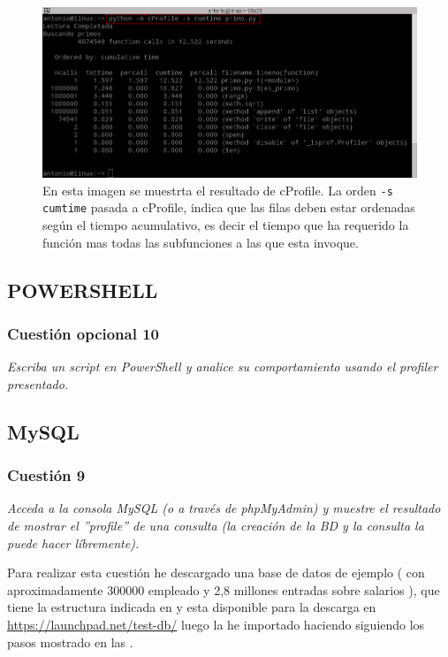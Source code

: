 \begin{figure}[H]
  \begin{center}
    \includegraphics[width=1\textwidth]{imagenes/cprof}
    \caption{En esta imagen se muestrta el resultado de cProfile. La orden \texttt{-s cumtime} pasada a cProfile, indica que las filas deben estar ordenadas según el tiempo acumulativo, es decir el tiempo que ha requerido la función mas todas las subfunciones a las que esta invoque. }
    \label{fig21}
  \end{center}
\end{figure}

\subsection{POWERSHELL}


\subsubsection{Cuestión opcional 10}
\textit{Escriba un script en PowerShell y analice su comportamiento usando el profiler presentado.}
\subsection{MySQL}



\subsubsection{Cuestión 9}
\textit{Acceda a la consola MySQL (o a través de phpMyAdmin) y muestre el resultado de mostrar el ''profile'' de una consulta (la creación de la BD y la consulta la puede hacer líbremente).}
\newline

Para realizar esta cuestión he descargado una base de datos de ejemplo \cite{db}( con aproximadamente 300000 empleado y 2,8 millones entradas sobre salarios ), que tiene la estructura indicada en \cite{db1} y esta disponible para la descarga en \url{https://launchpad.net/test-db/} luego la he importado haciendo siguiendo los pasos mostrado en las .

